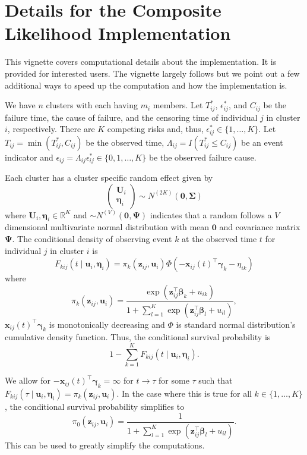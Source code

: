 \documentclass{article}
\newcommand\mat[1]{\mathbf{#1}}
\renewcommand\vec{\bm}
\begin{document}
\section{Details for the Composite Likelihood Implementation}

This vignette covers computational details about the implementation. 
It is provided for interested users. The vignette largely follows 
\cite{Cederkvist18} but we point out a few additional ways to speed up 
the computation and how the implementation is.

We have $n$ clusters with each having $m_i$ members. Let 
$T_{ij}^*$, $\epsilon_{ij}^*$, and $C_{ij}$ be the 
failure time, the cause of failure, and the censoring time 
of individual $j$ in cluster $i$, respectively. 
There are $K$ competing risks and, thus, 
$\epsilon_{ij}^*\in \{1,\dots,K\}$. Let $T_{ij} = \min(T_{ij}^*, C_{ij})$ 
be the observed time, 
$\Lambda_{ij} = I(T_{ij}^*\leq C_{ij})$ be an 
event indicator and $\epsilon_{ij} = \Lambda_{ij}\epsilon_{ij}^*\in \{0,1,\dots,K\}$ be the
observed failure cause. 

Each cluster has a cluster specific random effect given by %
%
$$
\begin{pmatrix}\vec U_i \\ \vec\eta_i\end{pmatrix}
  \sim N^{(2K)}(\vec 0, \mat\Sigma)
$$%
%
where $\vec U_i,\vec\eta_i\in\mathbb R^K$ and $\sim N^{(V)}(\vec 0, \mat\Psi)$ 
indicates that a random follows a $V$ dimensional multivariate normal
distribution with mean $\vec 0$ and covariance matrix $\mat\Psi$. 
The conditional density of 
observing event $k$ at the observed time $t$ for individual $j$ in cluster 
$i$ is %
%
$$
F_{kij}(t\mid \vec u_i, \vec\eta_i) = 
  \pi_k(\vec z_{ij},\vec u_i)\Phi(-\vec x_{ij}(t)^\top\vec\gamma_k - \eta_{ik})
$$%
%
where %
%
$$
\pi_k(\vec z_{ij},\vec u_i) = 
  \frac{\exp(\vec z_{ij}^\top\vec\beta_k + u_{ik})}
       {1 + \sum_{l = 1}^K \exp(\vec z_{ij}^\top\vec\beta_l + u_{il})},
$$%
%
$\vec x_{ij}(t)^\top\vec\gamma_k$ is monotonically decreasing
and $\Phi$ is standard normal distribution's cumulative density 
function. 
Thus, the conditional 
survival probability is%
%
$$
1 - \sum_{k = 1}^K F_{kij}(t\mid \vec u_i, \vec\eta_i).
$$

We allow for $-\vec x_{ij}(t)^\top\vec\gamma_k = \infty$ 
for $t\rightarrow\tau$ for some $\tau$ such that 
$F_{kij}(\tau\mid \vec u_i, \vec\eta_i) = \pi_k(\vec z_{ij},\vec u_i)$. 
In the case where this is true for all $k\in\{1,\dots,K\}$, 
the conditional survival probability simplifies to %
%
$$
\pi_0(\vec z_{ij},\vec u_i) = 
  \frac
    1{1 + \sum_{l = 1}^K \exp(\vec z_{ij}^\top\vec\beta_l + u_{il})}.
$$%
% 
This can be used to greatly simplify the computations.
\end{document}
